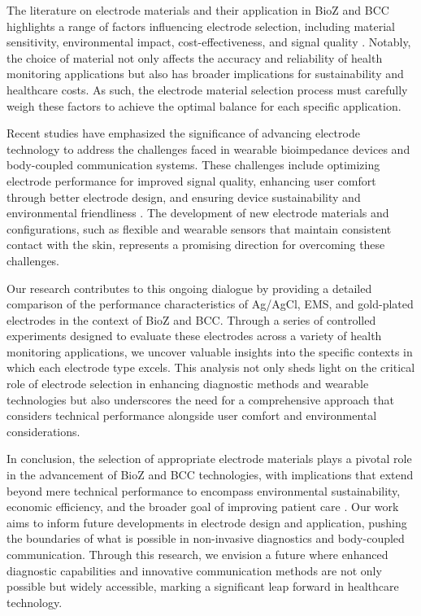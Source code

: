 {    The literature on electrode materials and their application in \gls{BioZ}  and \gls{BCC} highlights a range of factors influencing electrode selection, including material sensitivity, environmental impact, cost-effectiveness, and signal quality \cite{Buxi2013correlation}. Notably, the choice of material not only affects the accuracy and reliability of health monitoring applications but also has broader implications for sustainability and healthcare costs. As such, the electrode material selection process must carefully weigh these factors to achieve the optimal balance for each specific application.
    
    Recent studies have emphasized the significance of advancing electrode technology to address the challenges faced in wearable bioimpedance devices and body-coupled communication systems. These challenges include optimizing electrode performance for improved signal quality, enhancing user comfort through better electrode design, and ensuring device sustainability and environmental friendliness \cite{zaira2023prediction}. The development of new electrode materials and configurations, such as flexible and wearable sensors that maintain consistent contact with the skin, represents a promising direction for overcoming these challenges.
    
    Our research contributes to this ongoing dialogue by providing a detailed comparison of the performance characteristics of Ag/AgCl, \gls{EMS}, and gold-plated electrodes in the context of \gls{BioZ}  and \gls{BCC}. Through a series of controlled experiments designed to evaluate these electrodes across a variety of health monitoring applications, we uncover valuable insights into the specific contexts in which each electrode type excels. This analysis not only sheds light on the critical role of electrode selection in enhancing diagnostic methods and wearable technologies but also underscores the need for a comprehensive approach that considers technical performance alongside user comfort and environmental considerations.
    
    In conclusion, the selection of appropriate electrode materials plays a pivotal role in the advancement of \gls{BioZ}  and \gls{BCC} technologies, with implications that extend beyond mere technical performance to encompass environmental sustainability, economic efficiency, and the broader goal of improving patient care \cite{ormanis2020towards}. Our work aims to inform future developments in electrode design and application, pushing the boundaries of what is possible in non-invasive diagnostics and body-coupled communication. Through this research, we envision a future where enhanced diagnostic capabilities and innovative communication methods are not only possible but widely accessible, marking a significant leap forward in healthcare technology.
}